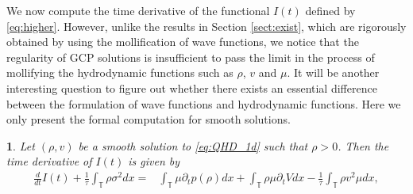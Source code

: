 \documentclass[leqno]{amsart}
\theoremstyle{plain}
\theoremstyle{definition}
\theoremstyle{remark}
\theoremstyle{plain}
\theoremstyle{plain}
\newtheorem{prop}[thm]{\protect\propositionname}
\providecommand{\propositionname}{Proposition}
\def\T{{\mathbb T}}%
\def\d{{\partial}}
\numberwithin{equation}{section}
\begin{document}
We now compute the time derivative of the functional $I(t)$ defined by \eqref{eq:higher}. However, unlike the results in Section \ref{sect:exist}, which are rigorously obtained by using the mollification of wave functions, we notice that the regularity of GCP solutions is insufficient to pass the limit in the process of mollifying the hydrodynamic functions such as $\rho $, $v $ and $\mu $. It will be another interesting question to figure out whether there exists an essential difference between the formulation of wave functions and hydrodynamic functions. Here we only present the formal computation for smooth solutions.

\begin{prop}\label{prop:dtI_apdx}
Let $(\rho , v )$ be a smooth solution to \eqref{eq:QHD_1d} such that $\rho >0$. Then the time derivative of $I (t)$ is given by
\begin{align*}
\frac{d}{dt}I (t)+\frac{1}{\tau}\int_\T \rho \sigma ^2 dx=&\int_\T\mu \d_tp(\rho )dx+\int_\T\rho \mu \d_tV  dx-\frac{1}{\tau}\int_\T\rho  v ^2\mu  dx,
\end{align*}
\end{prop}
\end{document}
